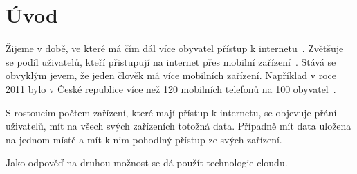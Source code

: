 \chapter{Úvod} 
Žijeme v době, ve které má čím dál více obyvatel přístup k internetu~\cite{InfTime}. Zvětšuje se podíl uživatelů, kteří přistupují na internet přes mobilní zařízení~\cite{InfTime}. Stává se obvyklým jevem, že jeden člověk má více mobilních zařízení. Například v roce 2011 bylo v České republice více než 120 mobilních telefonů na 100 obyvatel~\cite{InfTime}.

S rostoucím počtem zařízení, které mají přístup k internetu, se objevuje přání uživatelů, mít na všech svých zařízeních totožná data. Případně mít data uložena na jednom místě a mít k nim pohodlný přístup ze svých zařízení.

Jako odpověď na druhou možnost se dá použít technologie clou\-du. 